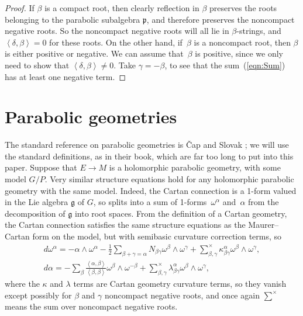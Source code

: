 \documentclass[pdftex]{sigma}
\newcommand{\gstruc}{\mathfrak{p}}
\begin{document}
\begin{proof}
If $\beta$ is a compact root, then clearly ref\/lection in
$\beta$ preserves the roots belonging to the parabolic subalgebra
$\gstruc$, and therefore preserves the noncompact negative roots.
So the noncompact negative roots will all lie in $\beta$-strings, and
$\left<\delta,\beta\right>=0$ for these roots. On the other hand, if~$\beta$ is a noncompact root, then $\beta$
is either positive or negative. We can assume that~$\beta$ is positive, since we only need to show that $\left<\delta,\beta\right> \ne 0$. Take
$\gamma=-\beta$, to see that the sum~(\ref{eqn:Sum}) has at least
one negative term.
\end{proof}

\section{Parabolic geometries}

The standard reference on parabolic
geometries is \v{C}ap and Slovak \cite{Cap/Slovak:2009};
we will use the standard def\/initions, as in their
book, which are far too long to put into this paper.
Suppose that $E \to M$ is a holomorphic
parabolic geometry, with some model $G/P$.
Very similar structure equations hold for any
holomorphic parabolic geometry with the same model. Indeed,
the Cartan connection is a 1-form valued in the Lie
algebra $\mathfrak{g}$ of $G$, so splits into a sum
of 1-forms~$\omega^{\alpha}$ and~$\alpha$ from the
decomposition of $\mathfrak{g}$ into root spaces.
From the def\/inition of a Cartan geometry, the
Cartan connection satisf\/ies the same structure
equations as the Maurer--Cartan form on the model,
but with semibasic curvature correction terms, so
\begin{gather*}
d \omega^{\alpha}  = - \alpha \wedge \omega^{\alpha} - \frac{1}{2}
\sum_{\beta + \gamma=\alpha} N_{\beta \gamma} \omega^{\beta} \wedge \omega^{\gamma}
+
\sum^{\times}_{\beta, \gamma}
\kappa^{\alpha}_{\beta \gamma} \omega^{\beta} \wedge \omega^{\gamma},
\\
d \alpha  =
-
\sum_{\beta} \frac{\left<\alpha,\beta\right>}
{\left<\beta,\beta\right>} \omega^{\beta} \wedge \omega^{-\beta}
+
\sum^{\times}_{\beta, \gamma}
\lambda^{\alpha}_{\beta \gamma} \omega^{\beta} \wedge \omega^{\gamma},
\end{gather*}
where the $\kappa$ and $\lambda$ terms are Cartan geometry
curvature terms, so they vanish except possibly for
$\beta$ and $\gamma$ noncompact negative roots, and
once again $\displaystyle{\sum^{\times}}$ means
the sum over noncompact negative roots.
\end{document}
